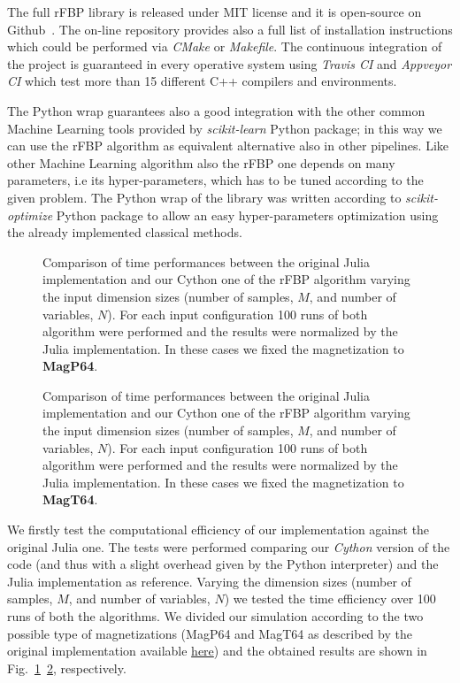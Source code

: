 \documentclass{standalone}
\begin{document}
The full rFBP library is released under MIT license and it is open-source on Github~\cite{ReplicatedFocusingBeliefPropagation}.
The on-line repository provides also a full list of installation instructions which could be performed via \emph{CMake} or \emph{Makefile}.
The continuous integration of the project is guaranteed in every operative system using \emph{Travis CI} and \emph{Appveyor CI} which test more than 15 different C++ compilers and environments.

The Python wrap guarantees also a good integration with the other common Machine Learning tools provided by \emph{scikit-learn} Python package; in this way we can use the rFBP algorithm as equivalent alternative also in other pipelines.
Like other Machine Learning algorithm also the rFBP one depends on many parameters, i.e its hyper-parameters, which has to be tuned according to the given problem.
The Python wrap of the library was written according to \emph{scikit-optimize} Python package to allow an easy hyper-parameters optimization using the already implemented classical methods.


\begin{figure}[htbp]
\centering
\def\svgwidth{0.85\textwidth}

\caption{Comparison of time performances between the original Julia implementation and our Cython one of the rFBP algorithm varying the input dimension sizes (number of samples, $M$, and number of variables, $N$).
For each input configuration 100 runs of both algorithm were performed and the results were normalized by the Julia implementation.
In these cases we fixed the magnetization to \textbf{MagP64}.
}
\label{fig:rfbp_magp}
\end{figure}

\begin{figure}[htbp]
\centering
\def\svgwidth{0.85\textwidth}

\caption{Comparison of time performances between the original Julia implementation and our Cython one of the rFBP algorithm varying the input dimension sizes (number of samples, $M$, and number of variables, $N$).
For each input configuration 100 runs of both algorithm were performed and the results were normalized by the Julia implementation.
In these cases we fixed the magnetization to \textbf{MagT64}.
}
\label{fig:rfbp_magt}
\end{figure}

We firstly test the computational efficiency of our implementation against the original Julia one.
The tests were performed comparing our \emph{Cython} version of the code (and thus with a slight overhead given by the Python interpreter) and the Julia implementation as reference.
Varying the dimension sizes (number of samples, $M$, and number of variables, $N$) we tested the time efficiency over 100 runs of both the algorithms.
We divided our simulation according to the two possible type of magnetizations (MagP64 and MagT64 as described by the original implementation available \href{https://github.com/carlobaldassi/BinaryCommitteeMachineFBP.jl}{here}) and the obtained results are shown in Fig.~\ref{fig:rfbp_magp}~\ref{fig:rfbp_magt}, respectively.
\end{document}
